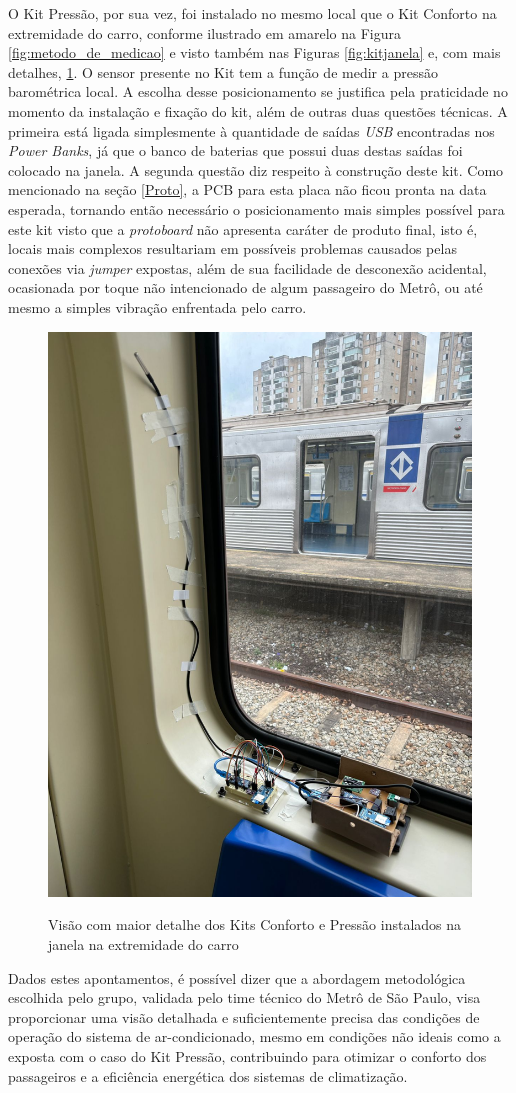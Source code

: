 \documentclass[acronym,symbols,table]{fei}
\begin{document}
O Kit Pressão, por sua vez, foi instalado no mesmo local que o Kit Conforto na extremidade do carro, conforme ilustrado em amarelo na Figura \ref{fig:metodo_de_medicao} e visto também nas Figuras \ref{fig:kitjanela} e, com mais detalhes, \ref{fig:kitjanelazoom}. O sensor presente no Kit tem a função de medir a pressão barométrica local. A escolha desse posicionamento se justifica pela praticidade no momento da instalação e fixação do kit, além de outras duas questões técnicas. A primeira está ligada simplesmente à quantidade de saídas \textit{USB} encontradas nos \textit{Power Banks}, já que o banco de baterias que possui duas destas saídas foi colocado na janela. A segunda questão diz respeito à construção deste kit. Como mencionado na seção \ref{Proto}, a PCB para esta placa não ficou pronta na data esperada, tornando então necessário o posicionamento mais simples possível para este kit visto que a \textit{protoboard} não apresenta caráter de produto final, isto é, locais mais complexos resultariam em possíveis problemas causados pelas conexões via \textit{jumper} expostas, além de sua facilidade de desconexão acidental, ocasionada por toque não intencionado de algum passageiro do Metrô, ou até mesmo a simples vibração enfrentada pelo carro.

\begin{figure}[!htb]
\centering
    \caption{Visão com maior detalhe dos Kits Conforto e Pressão instalados na janela na extremidade do carro}
    \includegraphics[width=0.50\linewidth]{Imagens/kitjanelazoom.jpeg}
    \label{fig:kitjanelazoom}
\end{figure}

Dados estes apontamentos, é possível dizer que a abordagem metodológica escolhida pelo grupo, validada pelo time técnico do Metrô de São Paulo, visa proporcionar uma visão detalhada e suficientemente precisa das condições de operação do sistema de ar-condicionado, mesmo em condições não ideais como a exposta com o caso do Kit Pressão, contribuindo para otimizar o conforto dos passageiros e a eficiência energética dos sistemas de climatização. 
\end{document}
